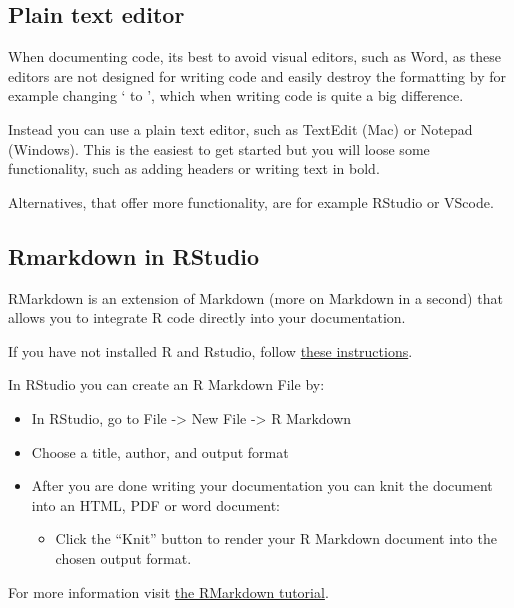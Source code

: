 \documentclass[
  letterpaper,
  DIV=11,
  numbers=noendperiod]{scrreprt}
\providecommand{\tightlist}{%
  \setlength{\itemsep}{0pt}\setlength{\parskip}{0pt}}\usepackage{longtable,booktabs,array}
\begin{document}
\subsection{Plain text editor}\label{plain-text-editor}

When documenting code, its best to avoid visual editors, such as Word,
as these editors are not designed for writing code and easily destroy
the formatting by for example changing ` to ', which when writing code
is quite a big difference.

Instead you can use a plain text editor, such as TextEdit (Mac) or
Notepad (Windows). This is the easiest to get started but you will loose
some functionality, such as adding headers or writing text in bold.

Alternatives, that offer more functionality, are for example RStudio or
VScode.

\subsection{Rmarkdown in RStudio}\label{rmarkdown-in-rstudio}

RMarkdown is an extension of Markdown (more on Markdown in a second)
that allows you to integrate R code directly into your documentation.

If you have not installed R and Rstudio, follow
\href{https://rstudio-education.github.io/hopr/starting.html}{these
instructions}.

In RStudio you can create an R Markdown File by:

\begin{itemize}
\tightlist
\item
  In RStudio, go to File -\textgreater{} New File -\textgreater{} R
  Markdown
\item
  Choose a title, author, and output format
\item
  After you are done writing your documentation you can knit the
  document into an HTML, PDF or word document:

  \begin{itemize}
  \tightlist
  \item
    Click the ``Knit'' button to render your R Markdown document into
    the chosen output format.
  \end{itemize}
\end{itemize}

For more information visit
\href{https://rmarkdown.rstudio.com/lesson-1.html}{the RMarkdown
tutorial}.
\end{document}
